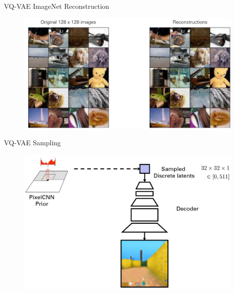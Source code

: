 \begin{frame}[allowframebreaks]{VQ-VAE ImageNet Reconstruction}
\begin{figure}
        \centering
        \includegraphics[height=0.9\textheight, width=\textwidth, keepaspectratio]{images/vae/vq_vae_reconstructions.PNG}
\end{figure}
\end{frame}

\begin{frame}[allowframebreaks]{VQ-VAE Sampling}
\begin{figure}
        \centering
        \includegraphics[height=0.9\textheight, width=\textwidth, keepaspectratio]{images/vae/vq_vae_sampling.PNG}
\end{figure}
\end{frame}

